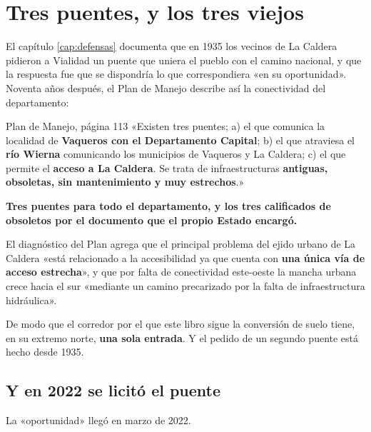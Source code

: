 \section{Tres puentes, y los tres viejos}

El capítulo \ref{cap:defensas} documenta que en 1935 los vecinos de La Caldera pidieron a Vialidad un puente
que uniera el pueblo con el camino nacional, y que la respuesta fue que se dispondría lo que
correspondiera «en su oportunidad». Noventa años después, el Plan de Manejo describe así la
conectividad del departamento:

\begin{ficha}{Plan de Manejo, página 113}
«Existen tres puentes; a) el que comunica la localidad de \textbf{Vaqueros con el Departamento
Capital}; b) el que atraviesa el \textbf{río Wierna} comunicando los municipios de Vaqueros y
La Caldera; c) el que permite el \textbf{acceso a La Caldera}. Se trata de infraestructuras
\textbf{antiguas, obsoletas, sin mantenimiento y muy estrechos}.»
\end{ficha}

\textbf{Tres puentes para todo el departamento, y los tres calificados de obsoletos por el
documento que el propio Estado encargó.}

El diagnóstico del Plan agrega que el principal problema del ejido urbano de La Caldera «está
relacionado a la accesibilidad ya que cuenta con \textbf{una única vía de acceso estrecha}», y
que por falta de conectividad este-oeste la mancha urbana crece hacia el sur «mediante un
camino precarizado por la falta de infraestructura hidráulica».

De modo que el corredor por el que este libro sigue la conversión de suelo tiene, en su
extremo norte, \textbf{una sola entrada}. Y el pedido de un segundo puente está hecho desde
1935.

\subsection*{Y en 2022 se licitó el puente}

La «oportunidad» llegó en marzo de 2022.

